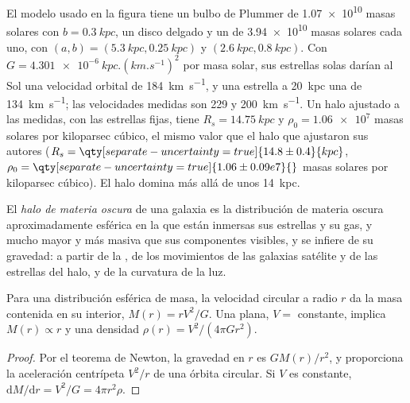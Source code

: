 El modelo usado en la figura tiene un bulbo de Plummer de
\num{1.07e10} masas solares con $b = \qty{0.3}{kpc}$, un disco delgado y un
 de \num{3.94e10} masas solares cada uno, con $(a, b) =
(\qty{5.3}{kpc}, \qty{0.25}{kpc})$ y $(\qty{2.6}{kpc}, \qty{0.8}{kpc})$.
Con $G = \qty{4.301e-6}{kpc.(km.s^{-1})^2}$ por masa solar, sus estrellas
solas darían al Sol una velocidad orbital de \qty{184}{km.s^{-1}}, y una
estrella a \qty{20}{kpc} una de \qty{134}{km.s^{-1}}; las velocidades medidas son
229 y \qty{200}{km.s^{-1}}. Un halo ajustado a las medidas, con las
estrellas fijas, tiene $R_s = \qty{14.75}{kpc}$ y
$\rho_0 = \num{1.06e7}$ masas solares por kiloparsec cúbico, el mismo valor que
el halo que ajustaron sus autores ($R_s = \qty[separate-uncertainty=true]{14.8 \pm 0.4}{kpc}$,
$\rho_0 = \qty[separate-uncertainty=true]{1.06 \pm 0.09 e7}{}$ masas solares
por kiloparsec cúbico). El halo domina más allá de unos \qty{14}{kpc}.

\begin{definition}\label{def:b3:milky-way-galaxies:halo}
El \emph{halo de materia oscura} de una galaxia es la
distribución de materia oscura aproximadamente esférica en la que están inmersas sus estrellas y su gas,
y mucho mayor y más masiva que sus componentes visibles,
y se infiere de su gravedad: a partir de la , de los movimientos
de las galaxias satélite y de las estrellas del halo, y de la curvatura de la luz.
\end{definition}

\begin{theorem}\label{thm:b3:milky-way-galaxies:enclosed}
Para una distribución esférica de masa, la velocidad circular a radio $r$
da la masa contenida en su interior, $M(r) = rV^2/G$. Una  plana,
$V = $ constante, implica $M(r) \propto r$ y una densidad
$\rho(r) = V^2/(4\pi G r^2)$.
\end{theorem}

\begin{proof}
Por el teorema de Newton, la gravedad en $r$ es $GM(r)/r^2$, y proporciona la
aceleración centrípeta $V^2/r$ de una órbita circular. Si $V$ es constante,
$\mathrm{d}M/\mathrm{d}r = V^2/G = 4\pi r^2\rho$.
\end{proof}

